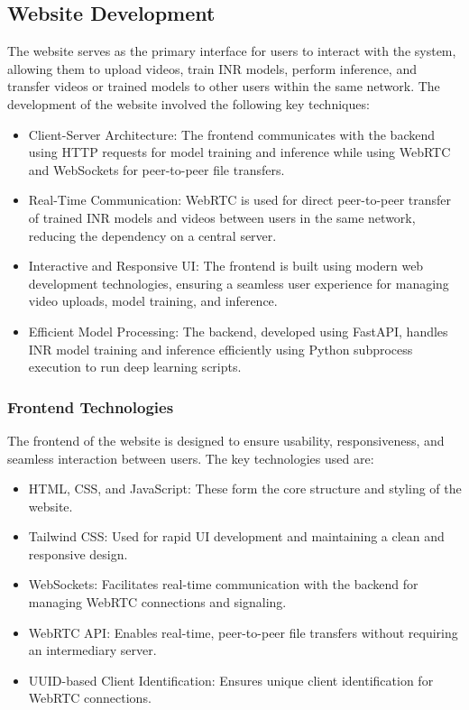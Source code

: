 \pagebreak

\subsection{Website Development}

The website serves as the primary interface for users to interact with the system, allowing them to upload videos, train INR models, perform inference, and transfer videos or trained models to other users within the same network. The development of the website involved the following key techniques:

\begin{itemize}
    \item Client-Server Architecture: The frontend communicates with the backend using HTTP requests for model training and inference while using WebRTC and WebSockets for peer-to-peer file transfers.
    \item Real-Time Communication: WebRTC is used for direct peer-to-peer transfer of trained INR models and videos between users in the same network, reducing the dependency on a central server.
    \item Interactive and Responsive UI: The frontend is built using modern web development technologies, ensuring a seamless user experience for managing video uploads, model training, and inference.
    \item Efficient Model Processing: The backend, developed using FastAPI, handles INR model training and inference efficiently using Python subprocess execution to run deep learning scripts.
\end{itemize}

\subsubsection{Frontend Technologies}

The frontend of the website is designed to ensure usability, responsiveness, and seamless interaction between users. The key technologies used are:

\begin{itemize}
    \item HTML, CSS, and JavaScript: These form the core structure and styling of the website.
    \item Tailwind CSS: Used for rapid UI development and maintaining a clean and responsive design.
    \item WebSockets: Facilitates real-time communication with the backend for managing WebRTC connections and signaling.
    \item WebRTC API: Enables real-time, peer-to-peer file transfers without requiring an intermediary server.
    \item UUID-based Client Identification: Ensures unique client identification for WebRTC connections.
\end{itemize}

